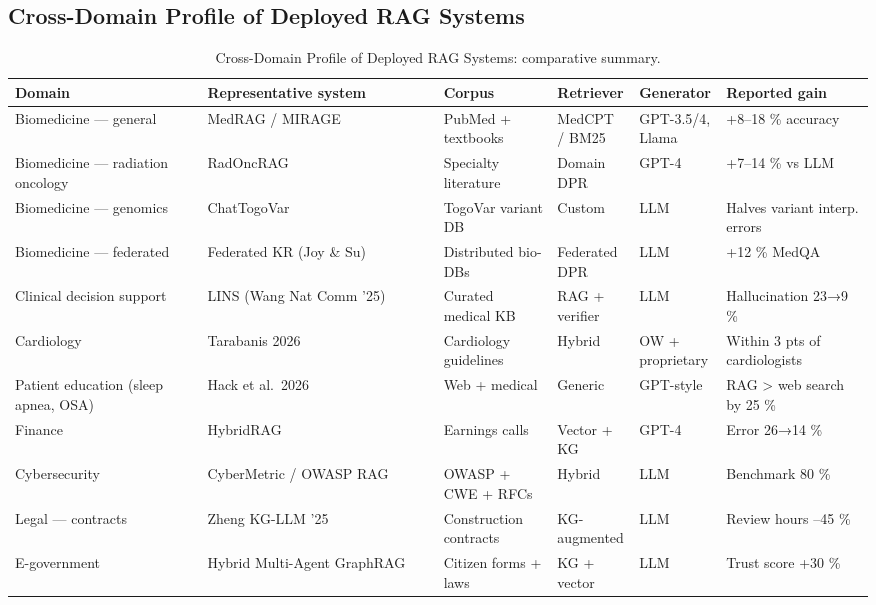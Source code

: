 \documentclass{article}
\begin{document}
\subsection{Cross-Domain Profile of Deployed RAG Systems}\label{cross-domain-profile-of-deployed-rag-systems}

\begin{table}[t]
\centering
\caption{Cross-Domain Profile of Deployed RAG Systems: comparative summary.}
\label{tab:cross-domain-profile-of-deployed-rag-systems}
\begin{tabular}{>{\raggedright\arraybackslash}p{0.2209\linewidth}
  >{\raggedright\arraybackslash}p{0.2761\linewidth}
  >{\raggedright\arraybackslash}p{0.1350\linewidth}
  >{\raggedright\arraybackslash}p{0.0920\linewidth}
  >{\raggedright\arraybackslash}p{0.0982\linewidth}
  >{\raggedright\arraybackslash}p{0.1779\linewidth}}
\toprule
Domain & Representative system & Corpus & Retriever & Generator & Reported gain \\
\midrule
Biomedicine --- general & MedRAG / MIRAGE & PubMed + textbooks & MedCPT / BM25 & GPT-3.5/4, Llama & +8--18 \% accuracy \\
Biomedicine --- radiation oncology & RadOncRAG & Specialty literature & Domain DPR & GPT-4 & +7--14 \% vs LLM \\
Biomedicine --- genomics & ChatTogoVar & TogoVar variant DB & Custom & LLM & Halves variant interp. errors \\
Biomedicine --- federated & Federated KR (Joy \& Su) & Distributed bio-DBs & Federated DPR & LLM & +12 \% MedQA \\
Clinical decision support & LINS (Wang Nat Comm '25) & Curated medical KB & RAG + verifier & LLM & Hallucination 23→9 \% \\
Cardiology & Tarabanis 2026 & Cardiology guidelines & Hybrid & OW + proprietary & Within 3 pts of cardiologists \\
Patient education (sleep apnea, OSA) & Hack et al.~2026 & Web + medical & Generic & GPT-style & RAG \textgreater{} web search by 25 \% \\
Finance & HybridRAG & Earnings calls & Vector + KG & GPT-4 & Error 26→14 \% \\
Cybersecurity & CyberMetric / OWASP RAG & OWASP + CWE + RFCs & Hybrid & LLM & Benchmark 80 \% \\
Legal --- contracts & Zheng KG-LLM '25 & Construction contracts & KG-augmented & LLM & Review hours --45 \% \\
E-government & Hybrid Multi-Agent GraphRAG & Citizen forms + laws & KG + vector & LLM & Trust score +30 \% \\

\end{tabular}
\end{table}
\end{document}

